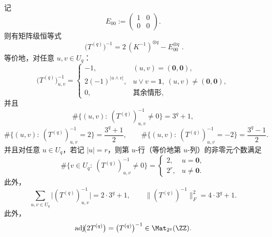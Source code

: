 \begin{conclusion}[逆核的矩阵级闭式与支撑稀疏结构]\label{con:xi-terminal-disjointness-boolean-inverse-closed-form}
记
\[
E_{00}:=\begin{pmatrix}1&0\\[2pt]0&0\end{pmatrix}.
\]
则有矩阵级恒等式
\[
\boxed{\;
\bigl(T^{(q)}\bigr)^{-1}
=2\,(K^{-1})^{\otimes q}-E_{00}^{\otimes q}\; }.
\]
等价地，对任意 \(u,v\in U_q\)：
\[
\boxed{\;
\bigl(T^{(q)}\bigr)^{-1}_{u,v}
=
\begin{cases}
-1,&(u,v)=(\mathbf 0,\mathbf 0),\\[2pt]
2(-1)^{|u\wedge v|},&u\vee v=\mathbf 1,\ (u,v)\neq(\mathbf 0,\mathbf 0),\\[2pt]
0,&\text{其余情形},
\end{cases}\;}
\]
并且
\[
\#\{(u,v):\ (T^{(q)})^{-1}_{u,v}\neq 0\}=3^q+1,
\]
\[
\#\{(u,v):\ (T^{(q)})^{-1}_{u,v}=2\}=\frac{3^q+1}{2},
\qquad
\#\{(u,v):\ (T^{(q)})^{-1}_{u,v}=-2\}=\frac{3^q-1}{2}.
\]
并且对任意 \(u\in U_q\)，若记 \(|u|=r\)，则第 \(u\)-行（等价地第 \(u\)-列）的非零元个数满足
\[
\#\{v\in U_q:\ (T^{(q)})^{-1}_{u,v}\neq 0\}
=
\begin{cases}
2,&u=\mathbf 0,\\[2pt]
2^r,&u\neq \mathbf 0.
\end{cases}
\]
此外，
\[
\sum_{u,v\in U_q}\bigl|(T^{(q)})^{-1}_{u,v}\bigr|=2\cdot 3^q+1,
\qquad
\bigl\|(T^{(q)})^{-1}\bigr\|_F^2=4\cdot 3^q+1.
\]
此外，
\[
\operatorname{adj}\!\bigl(2T^{(q)}\bigr)=\bigl(T^{(q)}\bigr)^{-1}\in\Mat_{2^q}(\ZZ).
\]
\end{conclusion}

